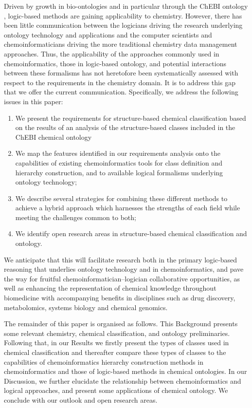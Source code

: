\documentclass[10pt]{bmc_article}
\newenvironment{bmcformat}{\baselineskip20pt\sloppy\setboolean{publ}{false}}{\baselineskip20pt\sloppy}
\begin{document}
\begin{bmcformat}
Driven by growth in bio-ontologies and in particular through the ChEBI ontology \cite{chebi2010}, logic-based methods are gaining applicability to chemistry. However, there has been little communication between the logicians driving the research underlying ontology technology and applications and the computer scientists and chemoinformaticians driving the more traditional chemistry data management approaches. Thus, the applicability of the approaches commonly used in chemoinformatics, those in logic-based ontology, and potential interactions between these formalisms has not heretofore been systematically assessed with respect to the requirements in the chemistry domain. It is to address this gap that we offer the current communication. Specifically, we address the following issues in this paper:
\begin{enumerate}
	\item We present the requirements for structure-based chemical classification based on the results of an analysis of the structure-based classes included in the ChEBI chemical ontology
	\item We map the features identified in our requirements analysis onto the capabilities of existing chemoinformatics tools for class definition and hierarchy construction, and to available logical formalisms underlying ontology technology;
	\item We describe several strategies for combining these different methods to achieve a hybrid approach which harnesses the strengths of each field while meeting the challenges common to both;
	\item We identify open research areas in structure-based chemical classification and ontology.
\end{enumerate}
 
We anticipate that this will facilitate research both in the primary logic-based reasoning that underlies ontology technology and in chemoinformatics, and pave the way for fruitful chemoinformatician--logician collaborative opportunities, as well as enhancing the representation of chemical knowledge throughout biomedicine with accompanying benefits in disciplines such as drug discovery, metabolomics, systems biology and chemical genomics. 

The remainder of this paper is organised as follows. This Background presents some relevant chemistry, chemical classification, and ontology preliminaries.  Following that, in our Results we firstly present the types of classes used in chemical classification and thereafter compare these types of classes to the capabilities of chemoinformatics hierarchy construction methods in chemoinformatics and those of logic-based methods in chemical ontologies. In our Discussion, we further elucidate the relationship between chemoinformatics and logical approaches, and present some applications of chemical ontology.  We conclude with our outlook and open research areas. 



\end{bmcformat}
\end{document}
